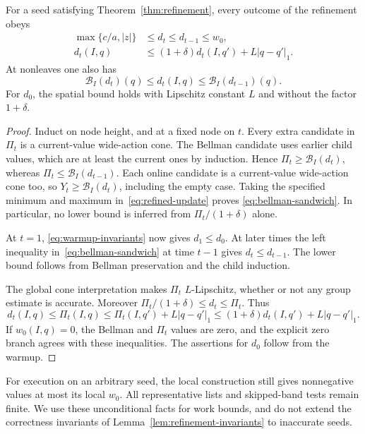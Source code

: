 \begin{lemma}\label{lem:refinement-invariants}
For a seed satisfying Theorem~\ref{thm:refinement}, every outcome of
the refinement obeys
\begin{align}
 \max\{c/a,|z|\}&\le d_t\le d_{t-1}\le w_0,
 \label{eq:refinement-invariants}\\
 d_t(I,q)&\le(1+\delta)d_t(I,q')+L|q-q'|_1.
 \label{eq:refinement-lipschitz}
\end{align}
At nonleaves one also has
\begin{equation}\label{eq:bellman-sandwich}
 \mathcal B_I(d_t)(q)\le d_t(I,q)
           \le\mathcal B_I(d_{t-1})(q).
\end{equation}
For $d_0$, the spatial bound holds with Lipschitz constant $L$ and
without the factor $1+\delta$.
\end{lemma}

\begin{proof}
Induct on node height, and at a fixed node on $t$.  Every extra
candidate in $\Pi_t$ is a current-value wide-action cone.  The Bellman
candidate uses earlier child values, which are at least the current
ones by induction.  Hence $\Pi_t\ge\mathcal B_I(d_t)$, whereas
$\Pi_t\le\mathcal B_I(d_{t-1})$.  Each online candidate is a
current-value wide-action cone too, so
$Y_t\ge\mathcal B_I(d_t)$, including the empty case.  Taking the
specified minimum and maximum in~\eqref{eq:refined-update} proves
\eqref{eq:bellman-sandwich}.  In particular, no lower bound is inferred
from $\Pi_t/(1+\delta)$ alone.

At $t=1$, \eqref{eq:warmup-invariants} now gives $d_1\le d_0$.
At later times the left inequality in~\eqref{eq:bellman-sandwich}
at time $t-1$ gives $d_t\le d_{t-1}$.  The lower bound follows from
Bellman preservation and the child induction.

The global cone interpretation makes $\Pi_t$ $L$-Lipschitz, whether
or not any group estimate is accurate.  Moreover
$\Pi_t/(1+\delta)\le d_t\le\Pi_t$.  Thus
\[
 d_t(I,q)\le\Pi_t(I,q)
 \le\Pi_t(I,q')+L|q-q'|_1
 \le(1+\delta)d_t(I,q')+L|q-q'|_1.
\]
If $w_0(I,q)=0$, the Bellman and $\Pi_t$ values are zero, and the
explicit zero branch agrees with these inequalities.  The assertions
for $d_0$ follow from the warmup.
\end{proof}

For execution on an arbitrary seed, the local construction still gives
nonnegative values at most its local $w_0$.  All representative lists
and skipped-band tests remain finite.  We use these unconditional
facts for work bounds, and do not extend the correctness invariants of
Lemma~\ref{lem:refinement-invariants} to inaccurate seeds.

